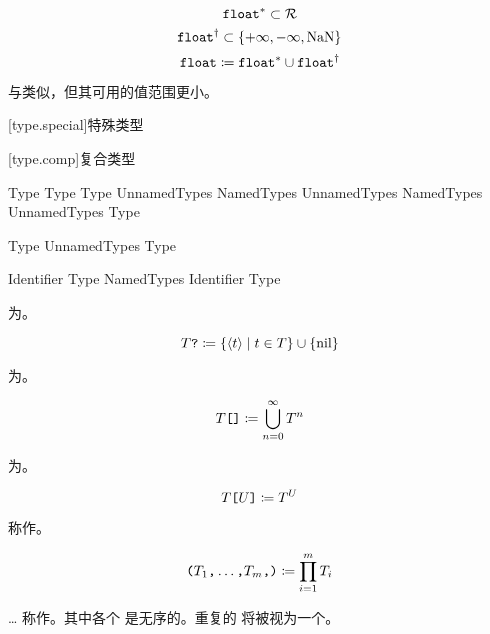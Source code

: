$$ \texttt{float}^\ast \subset \mathcal{R} $$
$$ \texttt{float}^\dagger \subset \{ +\infty, -\infty, \mathrm{NaN} \} $$
$$ \texttt{float} \coloneqq \texttt{float}^\ast \cup \texttt{float}^\dagger $$

与类似，但其可用的值范围更小。

[type.special]{特殊类型}

\begin{bnf}
 \br
     \br
\end{bnf}

[type.comp]{复合类型}

\begin{bnf}
 \br
    Type  \br
    Type \terminal{[} Type \terminal{]}
    \terminal{(} UnnamedTypes \terminal{)} \br
    \terminal{(} NamedTypes \terminal{)} \br
    \terminal{(} UnnamedTypes \terminal{,} NamedTypes \terminal{)} \br
    \terminal{\{} UnnamedTypes \terminal{\}}
    Type \terminal{*}
\end{bnf}

\begin{bnf}
 \br
    Type \br
    UnnamedTypes \terminal{,} Type
\end{bnf}

\begin{bnf}
 \br
    Identifier \terminal{:} Type \br
    NamedTypes \terminal{,} Identifier \terminal{:} Type
\end{bnf}

\pnum
{}为。

$$ T\texttt{?} \coloneqq \{ \langle t \rangle \mid t \in T \} \cup \{ \mathrm{nil} \} $$

\pnum
{}为。

$$ T\texttt{[]} \coloneqq \bigcup^\infty_{n=0} T^n $$

\pnum
{}为。

$$ T\texttt{[}U\texttt{]} \coloneqq T^U $$

\pnum
{} 称作。

$$ \texttt{(}T_1\texttt{,} \ldots\texttt{,} T_m\texttt{,}\texttt{)} \coloneqq \prod^m_{i=1} T_i$$

\pnum
{}\ldots{} 称作。其中各个  是无序的。重复的  将被视为一个。


